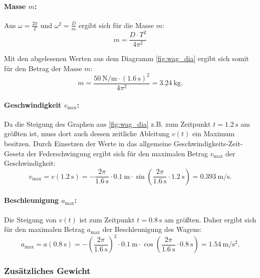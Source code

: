 \documentclass{ajc}
\begin{document}
	\paragraph{Masse $m$:} Aus $\omega = \frac{2\pi}{T}$ und $\omega^2 = \frac{D}{m}$ ergibt sich für die Masse $m$:
	\begin{equation}
		m = \frac{D \cdot T^2}{4\pi^2}
	\end{equation}
	
	Mit den abgelesenen Werten aus dem Diagramm \ref{fig:wag_dia} ergibt sich somit für den Betrag der Masse $m$:
	\begin{equation}
		m = \frac{\SI{50}{\newton\per\meter} \cdot (\SI{1.6}{\s})^2}{4\pi^2} = \SI{3.24}{\kg}.
	\end{equation}
	
	\paragraph{Geschwindigkeit $v_\text{max}$:} Da die Steigung des Graphen aus \ref{fig:wag_dia} z.B. zum Zeitpunkt $t = \SI{1.2}{\s}$ am größten ist, muss dort auch dessen zeitliche Ableitung $v(t)$ ein Maximum besitzen. Durch Einsetzen der Werte in das allgemeine Geschwindigkeits-Zeit-Gesetz der Federschwingung ergibt sich für den maximalen Betrag $v_\text{max}$ der Geschwindigkeit:
	\begin{equation}
		v_\text{max} = v(\SI{1.2}{\s}) = - \frac{2\pi}{\SI{1.6}{\s}} \cdot \SI{0.1}{\meter} \cdot \sin\left(\frac{2\pi}{\SI{1.6}{\s}} \cdot \SI{1.2}{\s}\right) = \SI{0.393}{\m\per\s}.
	\end{equation}
	
	\paragraph{Beschleunigung $a_\text{max}$:} Die Steigung von $v(t)$ ist zum Zeitpunkt $t = \SI{0.8}{\s}$ am größten. Daher ergibt sich für den maximalen Betrag $a_\text{max}$ der Beschleunigung des Wagens:
	\begin{equation}
		a_\text{max} = a(\SI{0.8}{\s}) = - \left(\frac{2\pi}{\SI{1.6}{\s}}\right)^2 \cdot \SI{0.1}{\meter} \cdot \cos\left(\frac{2\pi}{\SI{1.6}{\s}} \cdot \SI{0.8}{\s}\right) = \SI{1.54}{\m\per\s\squared}.
	\end{equation}
	
	\subsubsection{Zusätzliches Gewicht}
\end{document}
